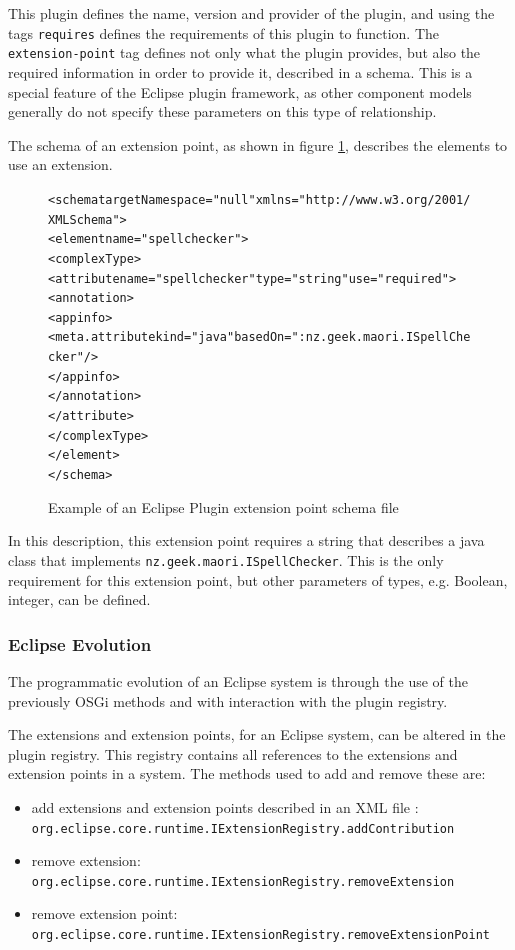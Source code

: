 This plugin defines the name, version and provider of the plugin, and using the tags \verb+requires+ defines the requirements of this plugin to function.
The \verb+extension-point+ tag defines not only what the plugin provides, but also the required information in order to provide it, described in a schema.
This is a special feature of the Eclipse plugin framework, as other component models generally do not specify these parameters on this type of relationship. 

The schema of an extension point, as shown in figure \ref{eclipseextensionschema}, describes the elements to use an extension.

\begin{figure}[htp]
\begin{center}
\begin{alltt}
<schema targetNamespace="null" xmlns="http://www.w3.org/2001/XMLSchema">
 <element name="spellchecker">
  <complexType>
   <attribute name="spellchecker" type="string" use="required">
    <annotation>
     <appinfo>
      <meta.attribute kind="java" basedOn=":nz.geek.maori.ISpellChecker"/>
     </appinfo>
    </annotation>
   </attribute>
  </complexType>
 </element>
</schema>
\end{alltt}
  \caption[Eclipse Plugin extension point schema]{Example of an Eclipse Plugin extension point schema file}
  \label{eclipseextensionschema}
\end{center}
\end{figure}

In this description, this extension point requires a string that describes a java class that implements \verb+nz.geek.maori.ISpellChecker+.
This is the only requirement for this extension point, but other parameters of types, e.g. Boolean, integer, can be defined.

\subsubsection{Eclipse Evolution}
The programmatic evolution of an Eclipse system is through the use of the previously OSGi methods and with interaction with the plugin registry.

The extensions and extension points, for an Eclipse system, can be altered in the plugin registry.
This registry contains all references to the extensions and extension points in a system.
The methods used to add and remove these are:

\begin{itemize}
  \item add extensions and extension points described in an XML file : \verb+org.eclipse.core.runtime.IExtensionRegistry.addContribution+
  \item remove extension: \verb+org.eclipse.core.runtime.IExtensionRegistry.removeExtension+
  \item remove extension point: \verb+org.eclipse.core.runtime.IExtensionRegistry.removeExtensionPoint+
\end{itemize}

